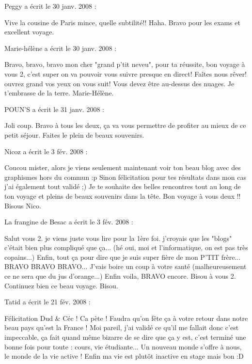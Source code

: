 \medskip
Peggy a écrit le 30 janv. 2008 :
\begin{displayquote}
Vive la cousine de Paris mince, quelle subtilité!! Haha.
Bravo pour les exams et excellent voyage.
\end{displayquote}

\medskip
Marie-hélène a écrit le 30 janv. 2008 :
\begin{displayquote}
Bravo, bravo, bravo mon cher "grand p'tit neveu", pour ta réussite, bon voyage à vous 2, c'est super on va pouvoir vous suivre presque en direct! Faîtes nous rêver! ouvrez grand vos yeux on vous suit!
Vous devez être au-dessus des nuages.
Je t'embrasse de la terre.
Marie-Hélène.
\end{displayquote}

\medskip
POUN'S a écrit le 31 janv. 2008 :
\begin{displayquote}
Joli coup.
Bravo à tous les deux, ça va vous permettre de profiter au mieux de ce petit séjour. Faites le plein de beaux souvenirs.
\end{displayquote}

\medskip
Nicoz a écrit le 3 fév. 2008 :
\begin{displayquote}
Coucou mister,
alors je viens seulement maintenant voir ton beau blog avec des graphismes hors du commun :p
Sinon félicitation pour tes résultats dans mon cas j'ai également tout validé ;)
Je te souhaite des belles rencontres tout au long de ton voyage et pleins de beaux souvenirs dans la tête.
Bon voyage à vous deux !!
Bisous
Nico.
\end{displayquote}

\medskip
La frangine de Besac a écrit le 3 fév. 2008 :
\begin{displayquote}
Salut vous 2. je viens juste vous lire pour la 1ère foi. j'croyais que les "blogs" c'était bien plus compliqué que ça... (hé oui, moi et l'informatique, on est pas très copains...)
Enfin, tout ça pour dire que je suis super fière de mon P'TIT frère... BRAVO BRAVO BRAVO... J'vais boire un coup à votre santé (malheureusement ce ne sera que du jus d'orange...)
Enfin voila, BRAVO encore.
Bisou à vous 2. Continuez bien ce beau voyage.
Bisou.
\end{displayquote}

\medskip
Tatid a écrit le 21 fév. 2008 :
\begin{displayquote}
Félicitation Dud \& Céc ! Ca pète !
Faudra qu'on fête ça à votre retour dans notre beau pays qu'est la France !
Moi pareil, j'ai validé ce qu'il me fallait donc c'est impeccable, ça fait quand même bizarre de se dire que ça y est, c'est terminé une bonne fois pour toute : cours, vie étudiante... Un nouveau monde s'offre à nous, le monde de la vie active ! Enfin ma vie est plutôt inactive en stage mais bon :D
\end{displayquote}

\vfill
